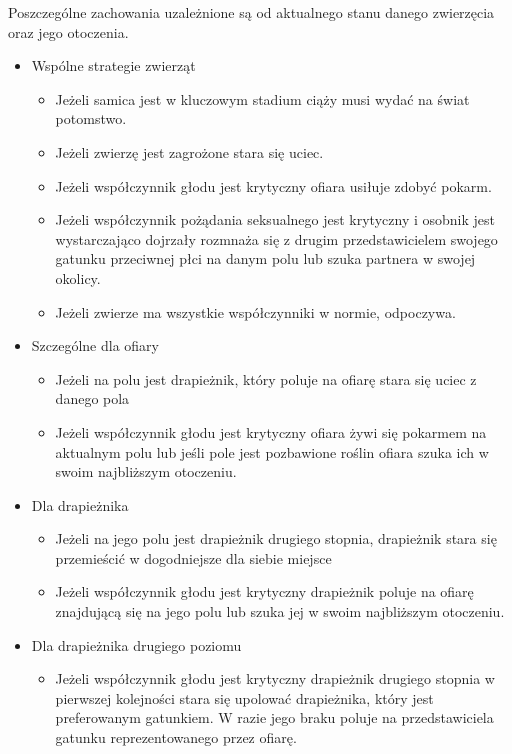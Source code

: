 Poszczególne zachowania uzależnione są od aktualnego stanu danego zwierzęcia oraz jego otoczenia.

\begin{itemize}
\item Wspólne strategie zwierząt
	\begin{itemize}
		\item Jeżeli samica jest w kluczowym stadium ciąży musi wydać na świat potomstwo.
		\item Jeżeli zwierzę jest zagrożone stara się uciec.
		\item Jeżeli współczynnik głodu jest krytyczny ofiara usiłuje zdobyć pokarm.
		\item Jeżeli współczynnik pożądania seksualnego jest krytyczny i osobnik jest wystarczająco dojrzały rozmnaża się z drugim przedstawicielem swojego gatunku przeciwnej płci na danym polu lub szuka partnera w swojej okolicy.
		\item Jeżeli zwierze ma wszystkie współczynniki w normie, odpoczywa.
	\end{itemize}
	
\item Szczególne dla ofiary
	\begin{itemize}
		\item Jeżeli na polu jest drapieżnik, który poluje na ofiarę stara się uciec z danego pola
		\item Jeżeli współczynnik głodu jest krytyczny ofiara żywi się pokarmem na aktualnym polu lub jeśli pole jest pozbawione roślin ofiara szuka ich w swoim najbliższym otoczeniu.
	\end{itemize}
	
\item Dla drapieżnika
	\begin{itemize}
		\item Jeżeli na jego polu jest drapieżnik drugiego stopnia, drapieżnik stara się przemieścić w dogodniejsze dla siebie miejsce
		\item Jeżeli współczynnik głodu jest krytyczny drapieżnik poluje na ofiarę znajdującą się na jego polu lub szuka jej w swoim najbliższym otoczeniu.
	\end{itemize}
	
\item Dla drapieżnika drugiego poziomu
	\begin{itemize}
		\item Jeżeli współczynnik głodu jest krytyczny drapieżnik drugiego stopnia w pierwszej kolejności stara się upolować drapieżnika, który jest preferowanym gatunkiem. W razie jego braku poluje na przedstawiciela gatunku reprezentowanego przez ofiarę.
	\end{itemize}
\end{itemize}

